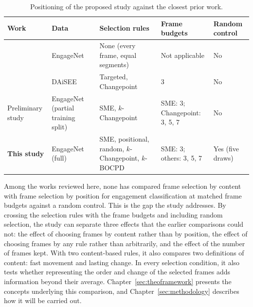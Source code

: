 \begin{table}[t]
   \centering
   \caption[Positioning of the proposed study]{Positioning of the proposed study against the closest prior work.}
   \label{tab:rw-positioning}
   \small
   \begin{tabular}{L{2.4cm}L{2.0cm}L{3.2cm}L{2.3cm}L{1.8cm}}
      \toprule
      Work & Data & Selection rules & Frame budgets & Random control \\
      \midrule
       & EngageNet & None (every frame, equal segments) & Not applicable & No \\
       & DAiSEE & Targeted, Changepoint & 3 & No \\
      Preliminary study & EngageNet (partial training split) & SME, $k$-Changepoint & SME: 3; Changepoint: 3, 5, 7 & No \\
      \textbf{This study} & EngageNet (full) & SME, positional, random, $k$-Changepoint, $k$-BOCPD & SME: 3; others: 3, 5, 7 & Yes (five draws) \\
      \bottomrule
   \end{tabular}
\end{table}

Among the works reviewed here, none has compared frame selection by content with frame selection by position for engagement classification at matched frame budgets against a random control. This is the gap the study addresses. By crossing the selection rules with the frame budgets and including random selection, the study can separate three effects that the earlier comparisons could not: the effect of choosing frames by content rather than by position, the effect of choosing frames by any rule rather than arbitrarily, and the effect of the number of frames kept. With two content-based rules, it also compares two definitions of content: fast movement and lasting change. In every selection condition, it also tests whether representing the order and change of the selected frames adds information beyond their average. Chapter~\ref{sec:theoframework} presents the concepts underlying this comparison, and Chapter~\ref{sec:methodology} describes how it will be carried out.
